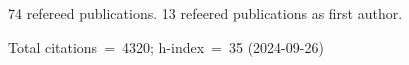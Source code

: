 74 refereed publications. 13 refeered publications as first author.

Total citations~=~4320; h-index~=~35 (2024-09-26)